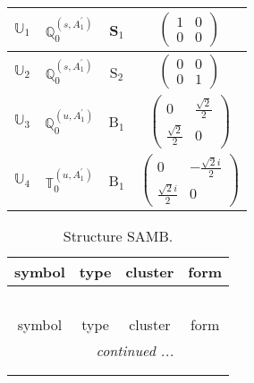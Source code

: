 \documentclass[fleqn,10pt,landscape]{article}
\begin{document}
\begin{itemize}
\begin{center}
\begin{longtable}{c|c|c|c}
$ \mathbb{U}_{1} $ & $\mathbb{Q}_{0}^{(s,A_{1}^{\prime})}$ & S$_{1}$ & $\begin{pmatrix} 1 & 0 \\ 0 & 0 \end{pmatrix}$ \\ \hline
$ \mathbb{U}_{2} $ & $\mathbb{Q}_{0}^{(s,A_{1}^{\prime})}$ & S$_{2}$ & $\begin{pmatrix} 0 & 0 \\ 0 & 1 \end{pmatrix}$ \\ \hline
$ \mathbb{U}_{3} $ & $\mathbb{Q}_{0}^{(u,A_{1}^{\prime})}$ & B$_{1}$ & $\begin{pmatrix} 0 & \frac{\sqrt{2}}{2} \\ \frac{\sqrt{2}}{2} & 0 \end{pmatrix}$ \\
$ \mathbb{U}_{4} $ & $\mathbb{T}_{0}^{(u,A_{1}^{\prime})}$ & B$_{1}$ & $\begin{pmatrix} 0 & - \frac{\sqrt{2} i}{2} \\ \frac{\sqrt{2} i}{2} & 0 \end{pmatrix}$ \\
\end{longtable}
\end{center}
\begin{center}
\renewcommand{\arraystretch}{1.3}
\begin{longtable}{c|c|c|c}
\caption{Structure SAMB.}
 \\
 \hline \hline
symbol & type & cluster & form \\ \hline \endfirsthead

\multicolumn{3}{l}{\tablename\ \thetable{}} \\
 \hline \hline
symbol & type & cluster & form \\ \hline \endhead

 \hline \hline
\multicolumn{3}{r}{\footnotesize\it continued ...} \\ \endfoot

 \hline \hline
\multicolumn{3}{r}{} \\ \endlastfoot


\end{longtable}
\end{center}
\end{itemize}
\end{document}

